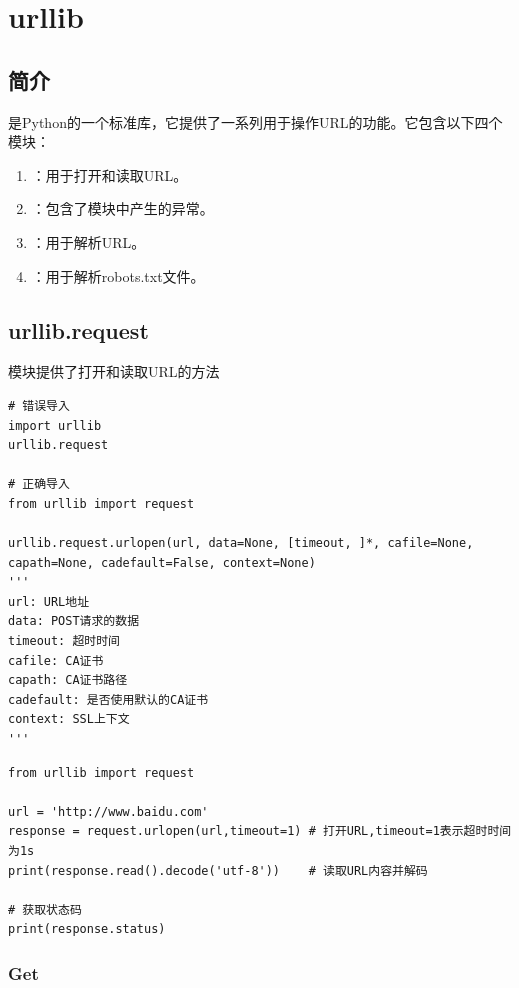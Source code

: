 \chapter{urllib}
\section{简介}
是Python的一个标准库，它提供了一系列用于操作URL的功能。它包含以下四个模块：
\begin{enumerate}[label=\arabic*)]
    \item {}：用于打开和读取URL。
    \item {}：包含了模块中产生的异常。
    \item {}：用于解析URL。
    \item {}：用于解析robots.txt文件。
\end{enumerate}

\section{urllib.request}
模块提供了打开和读取URL的方法 

\begin{lstlisting}[style=demostyle,numbers=none]
# 错误导入
import urllib 
urllib.request

# 正确导入
from urllib import request

urllib.request.urlopen(url, data=None, [timeout, ]*, cafile=None, capath=None, cadefault=False, context=None)
'''
url: URL地址
data: POST请求的数据
timeout: 超时时间
cafile: CA证书
capath: CA证书路径
cadefault: 是否使用默认的CA证书
context: SSL上下文
'''
\end{lstlisting}

\begin{lstlisting}[style=demostyle,numbers=none]
from urllib import request

url = 'http://www.baidu.com'   
response = request.urlopen(url,timeout=1) # 打开URL,timeout=1表示超时时间为1s
print(response.read().decode('utf-8'))    # 读取URL内容并解码

# 获取状态码
print(response.status)
\end{lstlisting}

\subsection{Get}

